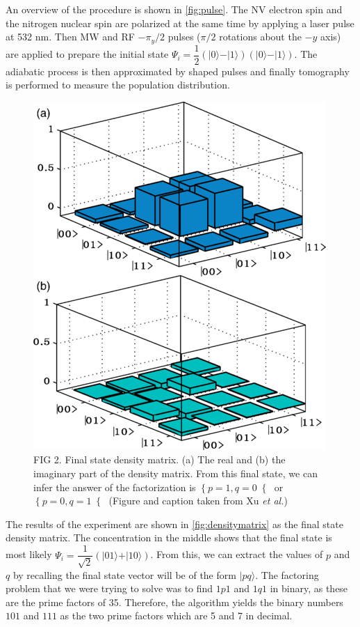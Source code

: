 \documentclass[%
 reprint,
 amsmath,amssymb,
 aps,
]{revtex4-1}
\begin{document}
	An overview of the procedure is shown in \ref{fig:pulse}. The NV electron spin and the nitrogen nuclear spin are polarized at the same time by applying a laser pulse at 532 nm. Then MW and RF $-\pi_y/2$ pulses ($\pi/2$ rotations about the $-y$ axis) are applied to prepare the initial state $\Psi_i = \dfrac{1}{2}\left(\vert 0 \rangle - \vert 1 \rangle   \right)\left(\vert 0 \rangle - \vert 1 \rangle   \right)$. The adiabatic process is then approximated by shaped pulses and finally tomography is performed to measure the population distribution. 

	\begin{figure}
	\includegraphics[scale=0.49]{Fig3XuEtAl}
	\caption{	
		FIG 2. Final state density matrix. (a) The real and (b) the imaginary part of the density matrix. From this final state, we can infer the answer of the factorization is $\left\lbrace p=1, q=0 \right\lbrace$ or $\left\lbrace p=0, q=1 \right\lbrace$ (Figure and caption taken from Xu \textit{et al.}\cite{Xu2017})
	}	
	\end{figure}
	\label{fig:densitymatrix}
	
	The results of the experiment are shown in \ref{fig:densitymatrix} as the final state density matrix. The concentration in the middle shows that the final state is most likely $\Psi_i = \dfrac{1}{\sqrt{2}}\left(\vert 01 \rangle + \vert 10 \rangle   \right)$. From this, we can extract the values of $p$ and $q$ by recalling the final state vector will be of the form $\vert pq \rangle$. The factoring problem that we were trying to solve was to find $1p1$ and $1q1$ in binary, as these are the prime factors of 35. Therefore, the algorithm yields the binary numbers $101$ and $111$ as the two prime factors which are 5 and 7 in decimal.
	
\end{document}
